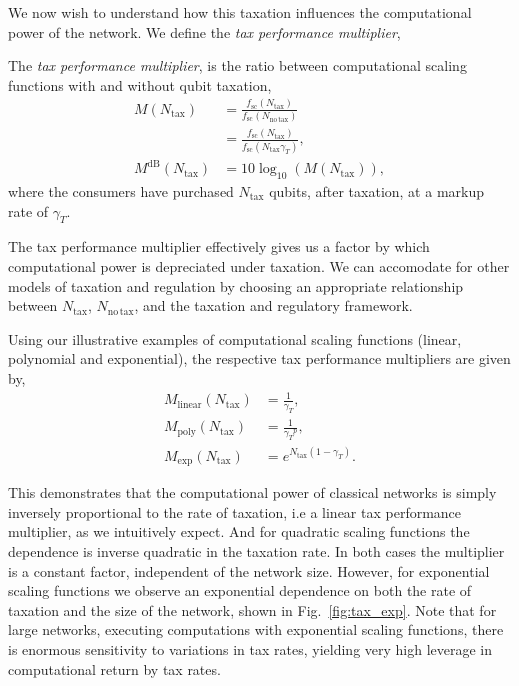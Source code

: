 We now wish to understand how this taxation influences the computational power of the network. We define the \textit{tax performance multiplier},
\begin{definition}
The \textit{tax performance multiplier}, is the ratio between computational scaling functions with and without qubit taxation,
\begin{align}
M(N_\mathrm{tax}) &= \frac{f_\mathrm{sc}(N_\mathrm{tax})}{f_\mathrm{sc}(N_\mathrm{no\,tax})} \nonumber \\
&= \frac{f_\mathrm{sc}(N_\mathrm{tax})}{f_\mathrm{sc}(N_\mathrm{tax} \gamma_T)},\nonumber\\
M^\mathrm{dB}(N_\mathrm{tax}) &= 10\log_{10}(M(N_\mathrm{tax})),
\end{align}
where the consumers have purchased $N_\mathrm{tax}$ qubits, after taxation, at a markup rate of $\gamma_T$.
\end{definition}
The tax performance multiplier effectively gives us a factor by which computational power is depreciated under taxation. We can accomodate for other models of taxation and regulation by choosing an appropriate relationship between $N_\mathrm{tax}$, $N_\mathrm{no\,tax}$, and the taxation and regulatory framework.

Using our illustrative examples of computational scaling functions (linear, polynomial and exponential), the respective tax performance multipliers are given by,
\begin{align}
M_\mathrm{linear}(N_\mathrm{tax}) &= \frac{1}{\gamma_T}, \nonumber \\
M_\mathrm{poly}(N_\mathrm{tax}) &= \frac{1}{{\gamma_T}^p}, \nonumber \\
M_\mathrm{exp} (N_\mathrm{tax}) &= e^{N_\mathrm{tax}(1-\gamma_T)}.
\end{align}

This demonstrates that the computational power of classical networks is simply inversely proportional to the rate of taxation, i.e a linear tax performance multiplier, as we intuitively expect. And for quadratic scaling functions the dependence is inverse quadratic in the taxation rate. In both cases the multiplier is a constant factor, independent of the network size. However, for exponential scaling functions we observe an exponential dependence on both the rate of taxation and the size of the network, shown in Fig.~\ref{fig:tax_exp}. Note that for large networks, executing computations with exponential scaling functions, there is enormous sensitivity to variations in tax rates, yielding very high leverage in computational return by tax rates.

